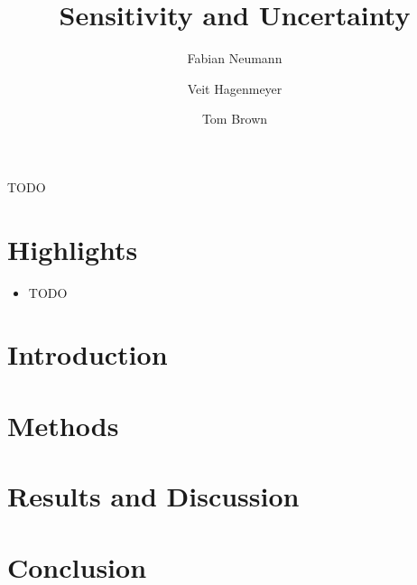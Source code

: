 \documentclass[1p]{elsarticle}
\begin{document}
\begin{frontmatter}

	\title{Sensitivity and Uncertainty}
	
	\author[kitaddress]{Fabian Neumann}
	\author[kitaddress]{Veit Hagenmeyer}
	\author[kitaddress]{Tom Brown}
	\address[kitaddress]{Institute for Automation and Applied Informatics (IAI), Karlsruhe Institute of Technology (KIT), Hermann-von-Helmholtz-Platz 1, 76344, Eggenstein-Leopoldshafen, Germany}

	\begin{abstract}
		
	\end{abstract}

	\begin{keyword}
		TODO
	\end{keyword}

\end{frontmatter}

\begin{small}
	\tableofcontents
\end{small}

\section*{Highlights}

\begin{itemize}
	\item TODO
\end{itemize}

\section{Introduction}
\label{sec:intro}

\section{Methods}
\label{sec:methods}



\section{Results and Discussion}
\label{sec:results}



\section{Conclusion}
\label{sec:conclusion}
\end{document}
